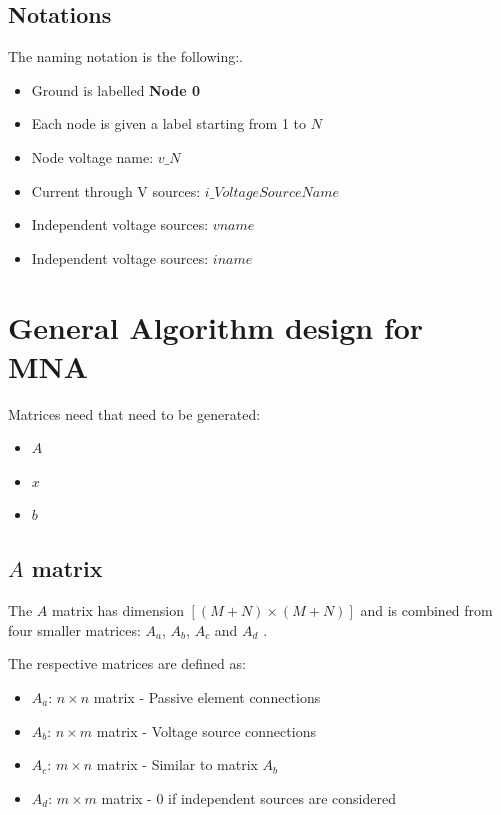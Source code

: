 \documentclass[a4paper, titlepage]{article}
\begin{document}
    \subsection{Notations}
    The naming notation is the following:\cite{nodeanalysis}.
    \begin{itemize}
        \item Ground is labelled \textbf{Node 0}
        \item Each node is given a label starting from 1 to $N$ 
        \item Node voltage name: $v\_N$
        \item Current through V sources: $i\_VoltageSourceName$
        \item Independent voltage sources: $vname$
        \item Independent voltage sources: $iname$
    \end{itemize}

    \pagebreak
    \section{General Algorithm design for MNA}
    Matrices need that need to be generated:
    \begin{itemize}
        \item $A$ 
        \item $x$ 
        \item $b$
    \end{itemize}
    \subsection{$A$ matrix}
    The $A$ matrix has dimension $[(M+N) \times (M+N)]$ and is combined from four smaller matrices: $A_a$, $A_b$, $A_c$ and $A_d$ \cite{nodeanalysis}.
    \par
    The respective matrices are defined as:
    \begin{itemize}
        \item $A_a$: $n \times n$ matrix - Passive element connections
        \item $A_b$: $n \times m$ matrix - Voltage source connections 
        \item $A_c$: $m \times n$ matrix - Similar to matrix $A_b$
        \item $A_d$: $m \times m$ matrix - 0 if independent sources are considered
    \end{itemize}
\end{document}
